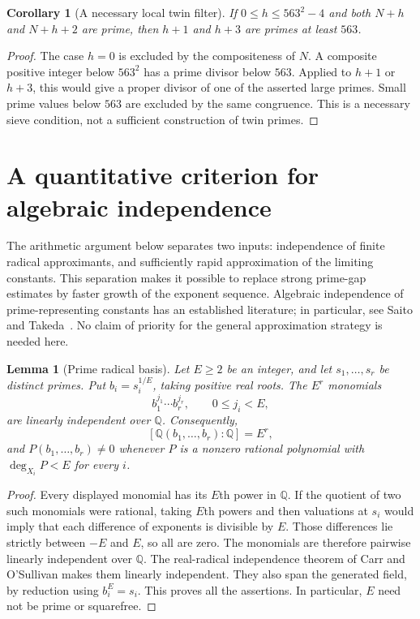 \documentclass[11pt,a4paper]{article}
\newtheorem{lemma}[theorem]{Lemma}
\newtheorem{corollary}[theorem]{Corollary}
\theoremstyle{definition}
\theoremstyle{remark}
\numberwithin{equation}{section}
\begin{document}
\begin{corollary}[A necessary local twin filter]
If $0\le h\le563^2-4$ and both $N+h$ and $N+h+2$ are prime, then $h+1$ and $h+3$ are primes at least $563$.
\end{corollary}
\begin{proof}
The case $h=0$ is excluded by the compositeness of $N$. A composite positive integer below $563^2$ has a prime divisor below $563$. Applied to $h+1$ or $h+3$, this would give a proper divisor of one of the asserted large primes. Small prime values below $563$ are excluded by the same congruence. This is a necessary sieve condition, not a sufficient construction of twin primes.
\end{proof}


\section{A quantitative criterion for algebraic independence}
\label{enc:sec:quantitative-independence}

The arithmetic argument below separates two inputs: independence of finite
radical approximants, and sufficiently rapid approximation of the limiting
constants.  This separation makes it possible to replace strong prime-gap
estimates by faster growth of the exponent sequence.  Algebraic independence
of prime-representing constants has an established literature; in particular,
see Saito and Takeda~\cite{SaitoTakeda2022}.  No claim of priority for the
general approximation strategy is needed here.

\begin{lemma}[Prime radical basis]
\label{enc:lem:prime-radical-basis}
Let $E\ge2$ be an integer, and let $s_1,\ldots,s_r$ be distinct primes.  Put
$b_i=s_i^{1/E}$, taking positive real roots.  The $E^r$ monomials
\[
 b_1^{j_1}\cdots b_r^{j_r},\qquad 0\le j_i<E,
\]
are linearly independent over $\mathbb Q$.  Consequently,
\[
 [\mathbb Q(b_1,\ldots,b_r):\mathbb Q]=E^r,
\]
and $P(b_1,\ldots,b_r)\ne0$ whenever $P$ is a nonzero rational polynomial
with $\deg_{X_i}P<E$ for every $i$.
\end{lemma}

\begin{proof}
Every displayed monomial has its $E$th power in $\mathbb Q$.  If the quotient
of two such monomials were rational, taking $E$th powers and then valuations
at $s_i$ would imply that each difference of exponents is divisible by $E$.
Those differences lie strictly between $-E$ and $E$, so all are zero.
The monomials are therefore pairwise linearly independent over $\mathbb Q$.
The real-radical independence theorem of Carr and O'Sullivan
\cite[Theorem~1.1]{CarrOSullivan2009} makes them linearly independent.
They also span the generated field, by reduction using $b_i^E=s_i$.
This proves all the assertions.  In particular, $E$ need not be prime or
squarefree.
\end{proof}
\end{document}
